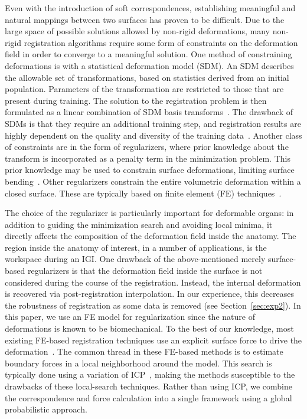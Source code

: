 \documentclass[journal]{IEEEtran}
\begin{document}
Even with the introduction of soft correspondences, establishing meaningful and natural mappings between two surfaces has proven to be difficult. Due to the large space of possible solutions allowed by non-rigid deformations, many non-rigid registration algorithms require some form of constraints on the deformation field in order to converge to a meaningful solution. One method of constraining deformations is with a statistical deformation model (SDM).  An SDM describes the allowable set of transformations, based on statistics derived from an initial population. Parameters of the transformation are restricted to those that are present during training.  The solution to the registration problem is then formulated as a linear combination of SDM basis transforms~\cite{Hu12a,Ashraf02a}. The drawback of SDMs is that they require an additional training step, and registration results are highly dependent on the quality and diversity of the training data~\cite{Hu12a}. Another class of constraints are in the form of regularizers, where prior knowledge about the transform is incorporated as a penalty term in the minimization problem. This prior knowledge may be used to constrain surface deformations, limiting surface bending~\cite{Chui03a,Karnik10a,Cerveri14a,Myronenko10a,Huang08a,Sahillioglu12a,Zhang08a,Zheng10a}. Other regularizers constrain the entire volumetric deformation within a closed surface.  These are typically based on finite element (FE) techniques~\cite{Cash05a,Ferrant01a,Moradi12a,Noe10a,Rucker14a,Farheen12a}.

The choice of the regularizer is particularly important for deformable organs: in addition to guiding the minimization search and avoiding local minima, it directly affects the composition of the deformation field inside the anatomy. The region inside the anatomy of interest, in a number of applications, is the workspace during an IGI. One drawback of the above-mentioned merely surface-based regularizers is that the deformation field inside the surface is not considered during the course of the registration.  Instead, the internal deformation is recovered via post-registration interpolation. In our experience, this decreases the robustness of registration as some data is removed (see Section~\ref{sec:exp2}). In this paper, we use an FE model for regularization since the nature of deformations is known to be biomechanical. To the best of our knowledge, most existing FE-based registration techniques use an explicit surface force to drive the deformation~\cite{Cash05a,Ferrant01a,Moradi12a,Noe10a,Rucker14a}. The common thread in these FE-based methods is to estimate boundary forces in a local neighborhood around the model. This search is typically done using a variation of ICP~\cite{Ferrant01a,Moradi12a,Rucker14a}, making the methods susceptible to the drawbacks of these local-search techniques. Rather than using ICP, we combine the correspondence and force calculation into a single framework using a global probabilistic approach.
\end{document}
